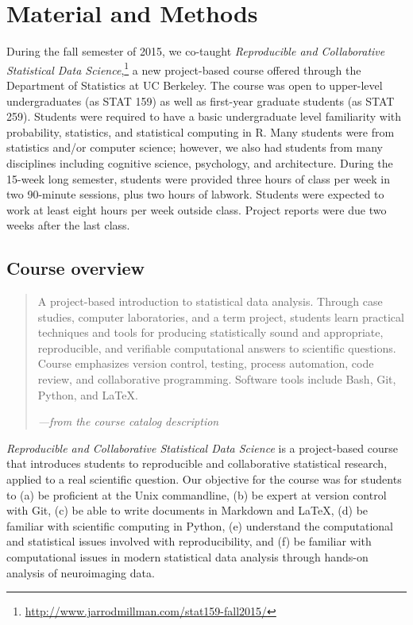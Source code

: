 \section{Material and Methods}\label{methods}

During the fall semester of 2015, we co-taught \emph{Reproducible and Collaborative
Statistical Data Science},\footnote{\url{http://www.jarrodmillman.com/stat159-fall2015/}}
a new project-based course offered through the Department of Statistics at UC Berkeley.
The course was open to upper-level undergraduates (as STAT 159) as well as
first-year graduate students (as STAT 259).
Students were required to have a basic undergraduate level familiarity with
probability, statistics, and statistical computing in R.
Many students were from statistics and/or computer science; however, we also
had students from many disciplines including cognitive science, psychology, and
architecture.
During the 15-week long semester, students were provided three hours of class
per week in two 90-minute sessions, plus two hours of labwork.
Students were expected to work at least eight hours per week outside class.
Project reports were due two weeks after the last class.

\subsection{Course overview}

\begin{quote}
A project-based introduction to statistical data analysis. Through case
studies, computer laboratories, and a term project, students learn
practical techniques and tools for producing statistically sound and
appropriate, reproducible, and verifiable computational answers to
scientific questions. Course emphasizes version control, testing,
process automation, code review, and collaborative programming.
Software tools include Bash, Git, Python, and \LaTeX.

\hfill\emph{---from the course catalog description}
\end{quote}

\emph{Reproducible and Collaborative Statistical Data Science} is a
project-based course that introduces students to reproducible and collaborative
statistical research, applied to a real scientific question.
Our objective for the course was for students to
(a) be proficient at the Unix commandline,
(b) be expert at version control with Git,
(c) be able to write documents in Markdown and \LaTeX,
(d) be familiar with scientific computing in Python,
(e) understand the computational and statistical issues involved with reproducibility, and
(f) be familiar with computational issues in modern statistical data
analysis through hands-on analysis of neuroimaging data.

